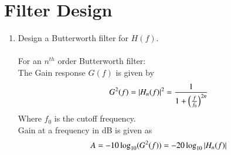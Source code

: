 \documentclass[journal,12pt,twocolumn]{IEEEtran}
\renewcommand\thesection{\arabic{section}}
\begin{document}
	\section{Filter Design}
	\begin{enumerate}[label=\thesection.\arabic*
		,ref=\thesection.\theenumi]
		\item Design a Butterworth filter for $H(f)$.\\
		\solution\\
		For an $n^{th}$ order Butterworth filter:\\
		The Gain response $G(f)$ is given by\\
		\begin{align}
			G^2(f) = |H_n(f)|^2 = \frac{1}{1 + \left(\frac{f}{f_0}\right)^{2n}}
		\end{align}
		Where $f_0$ is the cutoff frequency.\\
		Gain at a frequency in dB is given as
		\begin{align}
			A = -10\log_{10}(G^2(f)) = -20\log_{10}\left\vert H_n(f)\right\vert
			\label{eq:loss}
		\end{align}
		

\end{enumerate}
\end{document}
